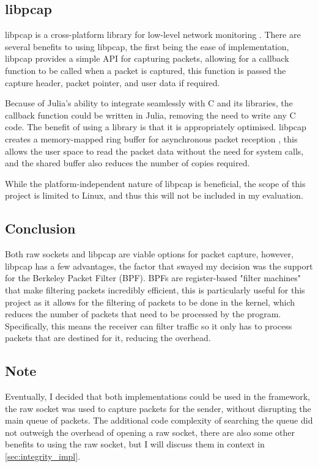 \subsection{libpcap}

libpcap is a cross-platform library for low-level network monitoring \cite{libpcap}. 
There are several benefits to using libpcap, the first being the ease of implementation, libpcap provides a simple API for capturing packets, allowing for a callback function to be called when a packet is captured, this function is passed the capture header, packet pointer, and user data if required.

Because of Julia's ability to integrate seamlessly with C and its libraries, the callback function could be written in Julia, removing the need to write any C code. The benefit of using a library is that it is appropriately optimised. libpcap creates a memory-mapped ring buffer for asynchronous packet reception \cite{packet_7}, this allows the user space to read the packet data without the need for system calls, and the shared buffer also reduces the number of copies required.

While the platform-independent nature of libpcap is beneficial, the scope of this project is limited to Linux, and thus this will not be included in my evaluation.

\subsection{Conclusion}

Both raw sockets and libpcap are viable options for packet capture, however, libpcap has a few advantages, the factor that swayed my decision was the support for the Berkeley Packet Filter (BPF). BPFs are register-based "filter machines" \cite{BPF} that make filtering packets incredibly efficient, this is particularly useful for this project as it allows for the filtering of packets to be done in the kernel, which reduces the number of packets that need to be processed by the program. Specifically, this means the receiver can filter traffic so it only has to process packets that are destined for it, reducing the overhead.

\subsection{Note}

Eventually, I decided that both implementations could be used in the framework, the raw socket was used to capture packets for the sender, without disrupting the main queue of packets. The additional code complexity of searching the queue did not outweigh the overhead of opening a raw socket, there are also some other benefits to using the raw socket, but I will discuss them in context in \ref{sec:integrity_impl}.

